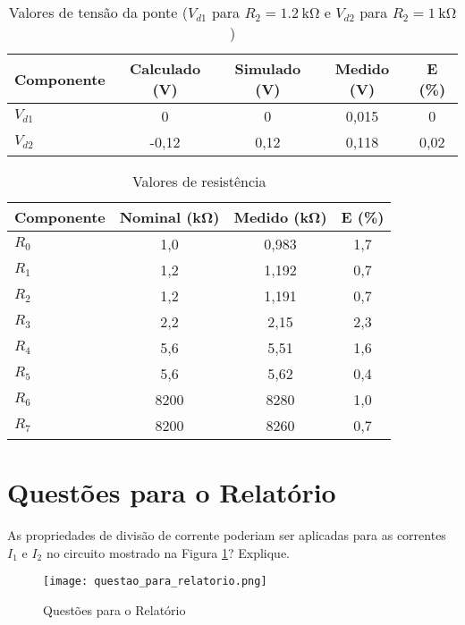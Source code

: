 \documentclass[a4paper, 12pt]{article}
\begin{document}
\begin{table}[H]
\centering
\caption{Valores de tensão da ponte ($V_{d1}$ para $R_2=\SI{1,2}{\kilo\ohm}$ e $V_{d2}$ para $R_2=\SI{1}{\kilo\ohm}$)}
\label{tab:tensoes_ponte} 
\begin{tabular}{|l|c|c|c|c|}
\hline
\textbf{Componente} & \textbf{Calculado (\si{\volt})} & \textbf{Simulado (\si{\volt})} & \textbf{Medido (\si{\volt})} & \textbf{E (\%)} \\
\hline
$V_{d1}$ & 0 & 0 & 0,015 & 0 \\ \hline
$V_{d2}$ & -0,12 & 0,12 & 0,118 & 0,02 \\ \hline
\end{tabular}
\end{table}



\begin{table}[H]
\centering
\caption{Valores de resistência}
\label{tab:resistencias}
\begin{tabular}{|l|c|c|c|}
\hline
\textbf{Componente} & \textbf{Nominal (\si{\kilo\ohm})} & \textbf{Medido (\si{\kilo\ohm})} & \textbf{E (\%)} \\
\hline
$R_0$ & 1,0 & 0,983 & 1,7 \\ \hline
$R_1$ & 1,2 & 1,192 & 0,7 \\ \hline
$R_2$ & 1,2 & 1,191 & 0,7 \\ \hline
$R_3$ & 2,2 & 2,15 & 2,3 \\ \hline
$R_4$ & 5,6 & 5,51 & 1,6 \\ \hline
$R_5$ & 5,6 & 5,62 & 0,4 \\ \hline
$R_6$ & 8200 & 8280 & 1,0 \\ \hline
$R_7$ & 8200 & 8260 & 0,7 \\ \hline
\end{tabular}
\end{table}

\section{Questões para o Relatório}
As propriedades de divisão de corrente poderiam ser aplicadas para as correntes $I_{1}$ e $I_{2}$ no
circuito mostrado na Figura \ref{fig:questao_para_relatorio}? Explique.

\begin{figure}[H]
\centering
\texttt{[image: questao\_para\_relatorio.png]}
\caption{Questões para o Relatório}
\label{fig:questao_para_relatorio}
\end{figure}
\end{document}
